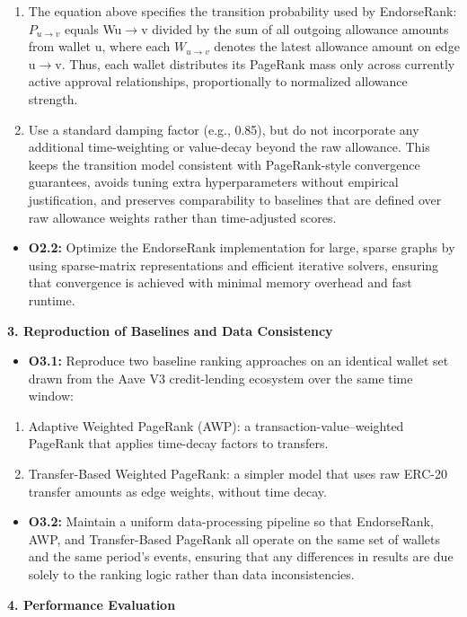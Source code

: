 \documentclass[12pt]{article}
\newcommand{\proposalSubheading}[1]{%
  \par\addvspace{0.38\baselineskip}%
  \noindent\textbf{#1}\par\nobreak\addvspace{0.08\baselineskip}%
}
\begin{document}
\begin{enumerate}
\item[(b)] The equation above specifies the transition probability used by EndorseRank: $P_{u\to v}$ equals Wu\(\to\)v divided by the sum of all outgoing allowance amounts from wallet u, where each $W_{u\to v}$ denotes the latest allowance amount on edge u\(\to\)v. Thus, each wallet distributes its PageRank mass only across currently active approval relationships, proportionally to normalized allowance strength.
\item[(c)] Use a standard damping factor (e.g., 0.85), but do not incorporate any additional time-weighting or value-decay beyond the raw allowance. This keeps the transition model consistent with PageRank-style convergence guarantees, avoids tuning extra hyperparameters without empirical justification, and preserves comparability to baselines that are defined over raw allowance weights rather than time-adjusted scores.
\end{enumerate}
\begin{itemize}
\item[\textbullet] \textbf{O2.2: }Optimize the EndorseRank implementation for large, sparse graphs by using sparse-matrix representations and efficient iterative solvers, ensuring that convergence is achieved with minimal memory overhead and fast runtime.
\end{itemize}
\proposalSubheading{3. Reproduction of Baselines and Data Consistency}

\begin{itemize}
\item[\textbullet] \textbf{O3.1: }Reproduce two baseline ranking approaches on an identical wallet set drawn from the Aave V3 credit-lending ecosystem over the same time window:
\end{itemize}
\begin{enumerate}
\item[(a)] Adaptive Weighted PageRank (AWP): a transaction-value--weighted PageRank that applies time-decay factors to transfers.
\item[(b)] Transfer-Based Weighted PageRank: a simpler model that uses raw ERC-20 transfer amounts as edge weights, without time decay.
\end{enumerate}
\begin{itemize}
\item[\textbullet] \textbf{O3.2: }Maintain a uniform data-processing pipeline so that EndorseRank, AWP, and Transfer-Based PageRank all operate on the same set of wallets and the same period's events, ensuring that any differences in results are due solely to the ranking logic rather than data inconsistencies.
\end{itemize}
\proposalSubheading{4. Performance Evaluation}
\end{document}
